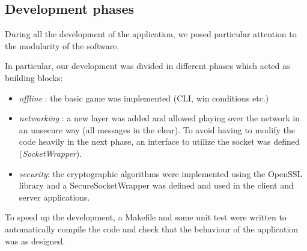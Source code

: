 \subsection{Development phases}
During all the development of the application, we posed particular attention to the modularity of the software.

In particular, our development was divided in different phases which acted as building blocks:
\begin{itemize}
	\item \textit{offline} : the basic game was implemented (CLI, win conditions etc.)
	\item \textit{networking} : a new layer was added and allowed playing over the network in an unsecure way (all messages in the clear). To avoid having to modify the code heavily in the next phase, an interface to utilize the socket was defined (\textit{SocketWrapper}).
	\item \textit{security}: the cryptographic algorithms were implemented using the OpenSSL library and a SecureSocketWrapper was defined and used in the client and server applications.
\end{itemize}

To speed up the development, a Makefile and some unit test were written to automatically compile the code and check that the behaviour of the application was as designed.
